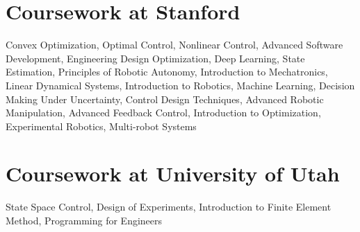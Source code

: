\documentclass[margin,line]{res}
\begin{document}
\begin{resume}
\section{\sc Coursework at Stanford}
Convex Optimization, Optimal Control, Nonlinear Control, Advanced Software Development, Engineering Design Optimization, Deep Learning, State Estimation, Principles of Robotic Autonomy, Introduction to Mechatronics, Linear Dynamical Systems, Introduction to Robotics, Machine Learning, Decision Making Under Uncertainty, Control Design Techniques, Advanced Robotic Manipulation, Advanced Feedback Control, Introduction to Optimization, Experimental Robotics, Multi-robot Systems
\\
\section{\sc Coursework at University of Utah}
State Space Control, Design of Experiments, Introduction to Finite Element Method, Programming for Engineers
\\

\end{resume}
\end{document}
